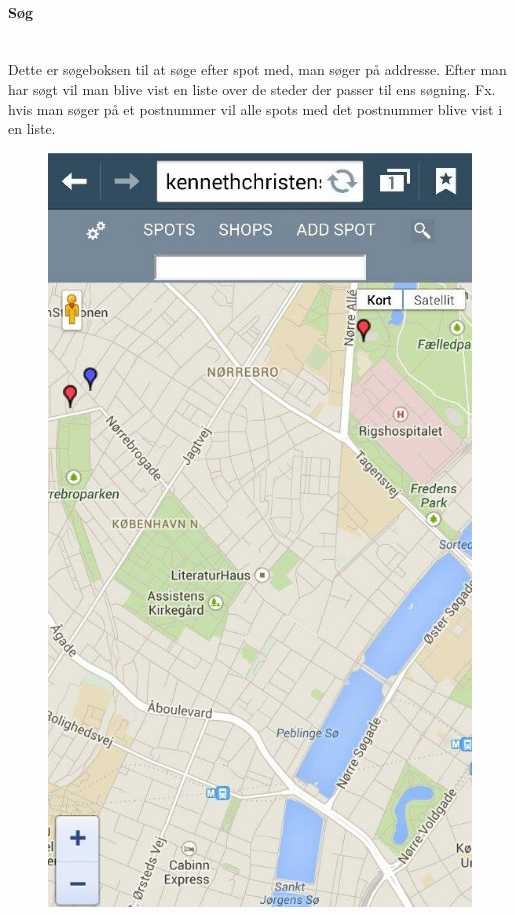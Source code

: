 \documentclass[12pt]{article}
\begin{document}
\newpage
\paragraph{Søg}\mbox{}\\
Dette er søgeboksen til at søge efter spot med, man søger på addresse. Efter man har søgt vil man blive vist en liste over de steder der passer til ens søgning. Fx. hvis man søger på et postnummer vil alle spots med det postnummer blive vist i en liste.\\
\begin{figure}[h]
\includegraphics[scale = 0.3]{search}
\end{figure}
\end{document}
